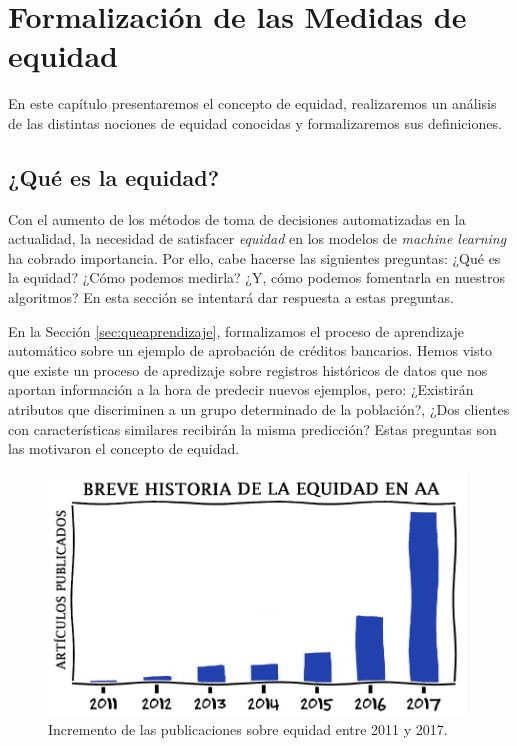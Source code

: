 \documentclass[oneside,openright,titlepage,numbers=noenddot,openany,headinclude,footinclude=true,
cleardoublepage=empty,abstractoff,BCOR=5mm,paper=a4,fontsize=12pt,main=spanish]{scrreprt}
\begin{document}
\chapter{Formalización de las Medidas de equidad} \label{ch:formalmedeq}

En este capítulo presentaremos el concepto de equidad, realizaremos un análisis de las distintas nociones de equidad conocidas y formalizaremos sus definiciones.

\section{¿Qué es la equidad?}

Con el aumento de los métodos de toma de decisiones automatizadas en la actualidad, la necesidad de satisfacer \textit{equidad} en los modelos de \textit{machine learning} ha cobrado importancia. Por ello, cabe hacerse las siguientes preguntas: ¿Qué es la equidad? ¿Cómo podemos medirla? ¿Y, cómo podemos fomentarla en nuestros algoritmos? En esta sección se intentará dar respuesta a estas preguntas.

En la Sección \ref{sec:queaprendizaje}, formalizamos el proceso de aprendizaje automático sobre un ejemplo de aprobación de créditos bancarios. Hemos visto que existe un proceso de apredizaje sobre registros históricos de datos que nos aportan información a la hora de predecir nuevos ejemplos, pero: ¿Existirán atributos que discriminen a un grupo determinado de la población?, ¿Dos clientes con características similares recibirán la misma predicción? Estas preguntas son las motivaron el concepto de equidad.\\

\begin{figure}[h]
	\centering
	\includegraphics[width=11.05cm]{exponencial.png}
	\caption{Incremento de las publicaciones sobre equidad entre 2011 y 2017.}
\end{figure}
\end{document}
